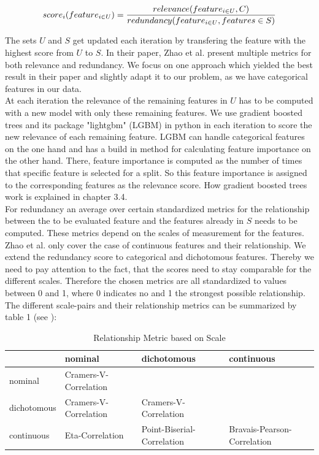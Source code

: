 \documentclass[12pt,titlepage]{article}
\begin{document}
\begin{equation} \label{score_raw}
    score_{i}(feature_{i \in U}) = \frac{relevance(feature_{i \in U}, C)}{redundancy(feature_{i \in U}, features \in S)} \\
\end{equation}

The sets $U$ and $S$ get updated each iteration by transfering the feature with the highest score from $U$ to $S$. In their paper, Zhao et al. present multiple metrics for both relevance and redundancy. We focus on one approach which yielded the best result in their paper and slightly adapt it to our problem, as we have categorical features in our data. \\
At each iteration the relevance of the remaining features in $U$ has to be computed with a new model with only these remaining features. We use gradient boosted trees and its package "lightgbm" (LGBM) in python in each iteration to score the new relevance of each remaining feature. LGBM can handle categorical features on the one hand and has a build in method for calculating feature importance on the other hand. There, feature importance is computed as the number of times that specific feature is selected for a split. So this feature importance is assigned to the corresponding features as the relevance score. How gradient boosted trees work is explained in chapter 3.4. \\
For redundancy an average over certain standardized metrics for the relationship between the to be evaluated feature and the features already in $S$ needs to be computed. These metrics depend on the scales of measurement for the features. Zhao et al. only cover the case of continuous features and their relationship. We extend the redundancy score to categorical and dichotomous features. Thereby we need to pay attention to the fact, that the scores need to stay comparable for the different scales. Therefore the chosen metrics are all standardized to values between 0 and 1, where 0 indicates no and 1 the strongest possible relationship. The different scale-pairs and their relationship metrics can be summarized by table 1 (see \cite{correlation}): \\

\setlength{\tabcolsep}{10pt} %
\renewcommand{\arraystretch}{1.5}

\begin{table}
    \centering
    \caption{Relationship Metric based on Scale}
    \begin{tabular}{l|l|l|l}
    \diagbox{}{} & nominal & dichotomous & continuous      \\
    \hline
    nominal                & Cramers-V-Correlation &         &                 \\
    \hline
    dichotomous            & Cramers-V-Correlation & Cramers-V-Correlation &                 \\
    \hline
    continuous             & Eta-Correlation & Point-Biserial-Correlation & Bravais-Pearson-Correlation
\end{tabular}
\end{table}
\end{document}
